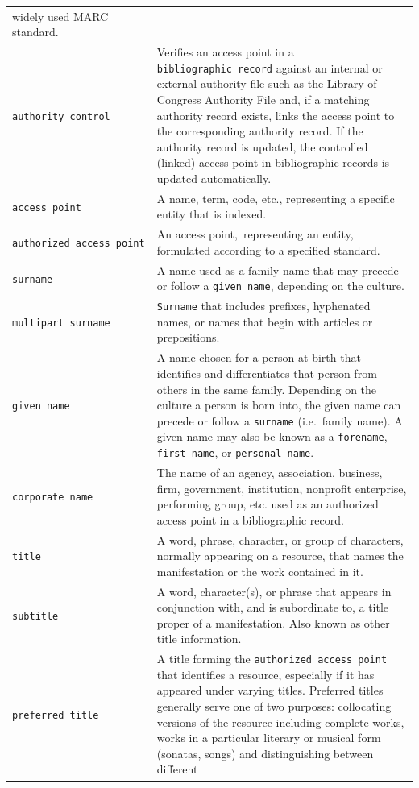 \documentclass[
  letterpaper,
  DIV=11,
  numbers=noendperiod]{scrreprt}
\begin{document}
\begin{longtable}[]{@{}
  >{\raggedright\arraybackslash}p{}
  >{\raggedright\arraybackslash}p{}@{}}
widely used MARC standard. \\
\texttt{authority\ control} & Verifies an access point in a
\texttt{bibliographic\ record} against an internal or external authority
file such as the Library of Congress Authority File and, if a matching
authority record exists, links the access point to the corresponding
authority record. If the authority record is updated, the controlled
(linked) access point in bibliographic records is updated
automatically. \\
\texttt{access\ point} & A name, term, code, etc., representing a
specific entity that is indexed. \\
\texttt{authorized\ access\ point} & An access point,~representing an
entity, formulated according to a specified standard. \\
\texttt{surname} & A name used as a family name that may precede or
follow a \texttt{given\ name}, depending on the culture. \\
\texttt{multipart\ surname} & \texttt{Surname} that includes prefixes,
hyphenated names, or names that begin with articles or prepositions. \\
\texttt{given\ name} & A name chosen for a person at birth that
identifies and differentiates that person from others in the same
family. Depending on the culture a person is born into, the given name
can precede or follow a \texttt{surname} (i.e.~family name). A given
name may also be known as a \texttt{forename}, \texttt{first\ name}, or
\texttt{personal\ name}. \\
\texttt{corporate\ name} & The name of an agency, association, business,
firm, government, institution, nonprofit enterprise, performing group,
etc. used as an authorized access point in a bibliographic record. \\
\texttt{title} & A word, phrase, character, or group of characters,
normally appearing on a resource, that names the manifestation or the
work contained in it. \\
\texttt{subtitle} & A word, character(s), or phrase that appears in
conjunction with, and is subordinate to, a title proper of a
manifestation. Also known as other title information. \\
\texttt{preferred\ title} & A title forming the
\texttt{authorized\ access\ point} that identifies a resource,
especially if it has appeared under varying titles. Preferred titles
generally serve one of two purposes: collocating versions of the
resource including complete works, works in a particular literary or
musical form (sonatas, songs) and distinguishing between different

\end{longtable}
\end{document}
